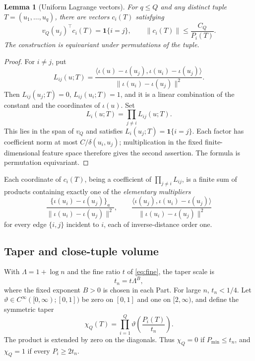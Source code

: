 \documentclass[11pt]{article}
\newtheorem{lemma}[lemma]{Lemma}
\newcommand{\norm}[1]{\lVert #1\rVert}
\newcommand{\ip}[2]{\langle #1,#2\rangle}
\newcommand{\one}{\mathbf{1}}
\begin{document}
\begin{lemma}[Uniform Lagrange vectors]
\label{lem:lagrange}
For \(q\le Q\) and any distinct tuple \(T=(u_1,\ldots,u_q)\),
there are vectors \(c_i(T)\) satisfying
\begin{equation}
 v_Q(u_j)^\top c_i(T)=\one\{i=j\},
 \qquad
 \norm{c_i(T)}\le\frac{C_Q}{P_i(T)}.
 \label{eq:lagrange}
\end{equation}
The construction is equivariant under permutations of the tuple.
\end{lemma}

\begin{proof}
For \(i\ne j\), put
\[
 L_{ij}(u;T)
 =\frac{\ip{\iota(u)-\iota(u_j)}{\iota(u_i)-\iota(u_j)}}
        {\norm{\iota(u_i)-\iota(u_j)}^2}.
\]
Then \(L_{ij}(u_j;T)=0\), \(L_{ij}(u_i;T)=1\), and it is a linear
combination of the constant and the coordinates of \(\iota(u)\).  Set
\[
 L_i(u;T)=\prod_{j\ne i}L_{ij}(u;T).
\]
This lies in the span of \(v_Q\) and satisfies
\(L_i(u_j;T)=\one\{i=j\}\).  Each factor has coefficient norm at most
\(C/\delta(u_i,u_j)\); multiplication in the fixed finite-dimensional
feature space therefore gives the second assertion.  The formula is
permutation equivariant.
\end{proof}


Each coordinate of \(c_i(T)\), being a coefficient of \(\prod_{j\ne i}L_{ij}\),
is a finite sum of products containing exactly one of the
\emph{elementary multipliers}
\begin{equation}
 \frac{\{\iota(u_i)-\iota(u_j)\}_a}{\norm{\iota(u_i)-\iota(u_j)}^2},
 \qquad
 \frac{\ip{\iota(u_j)}{\iota(u_i)-\iota(u_j)}}{\norm{\iota(u_i)-\iota(u_j)}^2}
 \label{eq:elementary-lagrange-multipliers}
\end{equation}
for every edge \(\{i,j\}\) incident to \(i\), each of inverse-distance
order one.

\subsection{Taper and close-tuple volume}

With \(\Lambda=1+\log n\) and the fine ratio \(t\) of \eqref{eq:fine},
the taper scale is
\begin{equation}
 t_n=t\Lambda^B,
 \label{eq:taper-scale}
\end{equation}
where the fixed exponent \(B>0\) is chosen in each Part.
For large \(n\), \(t_n<1/4\).  Let
\(\vartheta\in C^\infty([0,\infty);[0,1])\) be zero on \([0,1]\) and one
on \([2,\infty)\), and define the symmetric taper
\begin{equation}
 \chi_Q(T)=\prod_{i=1}^Q
 \vartheta\left(\frac{P_i(T)}{t_n}\right).
 \label{eq:taper}
\end{equation}
The product is extended by zero on the diagonals.  Thus \(\chi_Q=0\) if
\(P_{\min}\le t_n\), and \(\chi_Q=1\) if every \(P_i\ge2t_n\).
\end{document}
